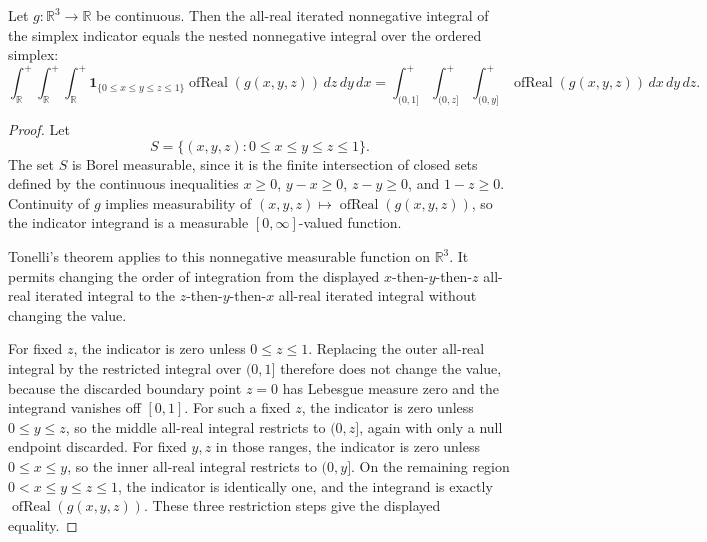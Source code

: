 \begin{helper}
Let \(g:\mathbb R^3\to\mathbb R\) be continuous.  Then the all-real iterated
nonnegative integral of the simplex indicator equals the nested
nonnegative integral over the ordered simplex:
\[
\int_{\mathbb R}^{+}\int_{\mathbb R}^{+}\int_{\mathbb R}^{+}
\mathbf 1_{\{0\le x\le y\le z\le1\}}
\operatorname{ofReal}(g(x,y,z))\,dz\,dy\,dx
=
\int_{(0,1]}^{+}\int_{(0,z]}^{+}\int_{(0,y]}^{+}
\operatorname{ofReal}(g(x,y,z))\,dx\,dy\,dz .
\]
\end{helper}
\begin{proof}
Let
\[
S=\{(x,y,z):0\le x\le y\le z\le1\}.
\]
The set \(S\) is Borel measurable, since it is the finite intersection of
closed sets defined by the continuous inequalities \(x\ge0\), \(y-x\ge0\),
\(z-y\ge0\), and \(1-z\ge0\).  Continuity of \(g\) implies measurability of
\((x,y,z)\mapsto\operatorname{ofReal}(g(x,y,z))\), so the indicator integrand
is a measurable \([0,\infty]\)-valued function.

Tonelli's theorem applies to this nonnegative measurable function on
\(\mathbb R^3\).  It permits changing the order of integration from the
displayed \(x\)-then-\(y\)-then-\(z\) all-real iterated integral to the
\(z\)-then-\(y\)-then-\(x\) all-real iterated integral without changing the
value.

For fixed \(z\), the indicator is zero unless \(0\le z\le1\).  Replacing the
outer all-real integral by the restricted integral over \((0,1]\) therefore
does not change the value, because the discarded boundary point \(z=0\) has
Lebesgue measure zero and the integrand vanishes off \([0,1]\).  For such a
fixed \(z\), the indicator is zero unless \(0\le y\le z\), so the middle
all-real integral restricts to \((0,z]\), again with only a null endpoint
discarded.  For fixed \(y,z\) in those ranges, the indicator is zero unless
\(0\le x\le y\), so the inner all-real integral restricts to \((0,y]\).  On
the remaining region \(0<x\le y\le z\le1\), the indicator is identically one,
and the integrand is exactly \(\operatorname{ofReal}(g(x,y,z))\).  These three
restriction steps give the displayed equality.
\end{proof}
